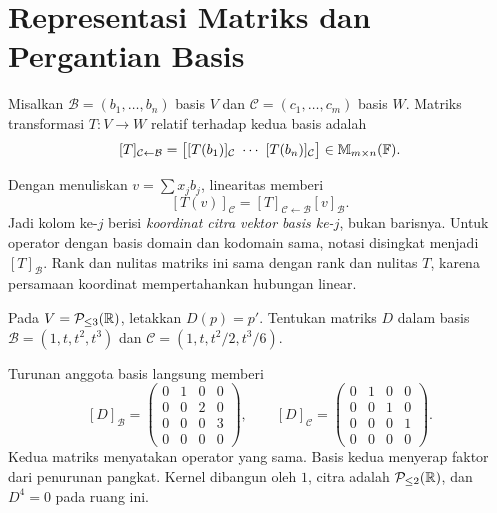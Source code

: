 \section{Representasi Matriks dan Pergantian Basis}

\begin{definisi}
    Misalkan $\mathcal B=(b_1,\ldots,b_n)$ basis $V$ dan
    $\mathcal C=(c_1,\ldots,c_m)$ basis $W$.
    Matriks transformasi $T:V\to W$ relatif terhadap kedua basis adalah
    \[
        [T]_{\mathcal C\leftarrow\mathcal B}
        =\bigl[[T(b_1)]_{\mathcal C}\ \cdots\
        [T(b_n)]_{\mathcal C}\bigr]\in\mathbb{M}_{m\times n}(\mathbb{F}).
    \]
\end{definisi}

Dengan menuliskan $v=\sum x_jb_j$, linearitas memberi
\[
    [T(v)]_{\mathcal C}
      =[T]_{\mathcal C\leftarrow\mathcal B}[v]_{\mathcal B}.
\]
Jadi kolom ke-$j$ berisi \emph{koordinat citra vektor basis
ke-$j$}, bukan barisnya. Untuk operator dengan basis domain dan
kodomain sama, notasi disingkat menjadi $[T]_{\mathcal B}$.
Rank dan nulitas matriks ini sama dengan rank dan nulitas $T$,
karena persamaan koordinat mempertahankan hubungan linear.

\begin{exam}
    Pada $V=\mathcal P_{\le3}(\mathbb{R})$, letakkan $D(p)=p'$.
    Tentukan matriks $D$ dalam basis
    $\mathcal B=(1,t,t^2,t^3)$ dan
    $\mathcal C=(1,t,t^2/2,t^3/6)$.
\end{exam}
\begin{solution}
    Turunan anggota basis langsung memberi
    \[
        [D]_{\mathcal B}
        =\begin{pmatrix}0&1&0&0\\0&0&2&0\\0&0&0&3\\0&0&0&0\end{pmatrix},
        \qquad
        [D]_{\mathcal C}
        =\begin{pmatrix}0&1&0&0\\0&0&1&0\\0&0&0&1\\0&0&0&0\end{pmatrix}.
    \]
    Kedua matriks menyatakan operator yang sama.
    Basis kedua menyerap faktor dari penurunan pangkat.
    Kernel dibangun oleh $1$, citra adalah $\mathcal P_{\le2}(\mathbb{R})$,
    dan $D^4=0$ pada ruang ini.
\end{solution}

